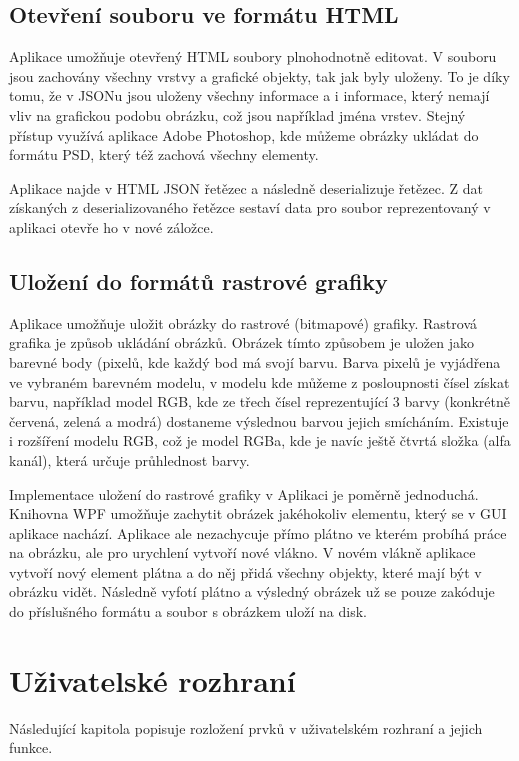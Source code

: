 \documentclass[
  field=inf,
  biblatex,
  glossaries,
  index
]{kidiplom}
\begin{document}
\subsection{Otevření souboru ve formátu HTML}
Aplikace umožňuje otevřený HTML soubory plnohodnotně editovat. V souboru jsou zachovány všechny vrstvy a grafické objekty, tak jak byly uloženy. To je díky tomu, že v JSONu jsou uloženy všechny informace a i informace, který nemají vliv na grafickou podobu obrázku, což jsou například jména vrstev. Stejný přístup využívá aplikace Adobe Photoshop, kde můžeme obrázky ukládat do formátu PSD, který též zachová všechny elementy.

Aplikace najde v HTML JSON řetězec a následně deserializuje řetězec. Z dat získaných z deserializovaného řetězce sestaví data pro soubor reprezentovaný v aplikaci otevře ho v nové záložce.

\subsection{Uložení do formátů rastrové grafiky}
Aplikace umožňuje uložit obrázky do rastrové (bitmapové) grafiky. Rastrová grafika je způsob ukládání obrázků. Obrázek tímto způsobem je uložen jako barevné body (pixelů, kde každý bod má svojí barvu. Barva pixelů je vyjádřena ve vybraném barevném modelu, v modelu kde můžeme z posloupnosti čísel získat barvu, například model RGB, kde ze třech čísel reprezentující 3 barvy (konkrétně červená, zelená a modrá) dostaneme výslednou barvou jejich smícháním. Existuje i rozšíření modelu RGB, což je model RGBa, kde je navíc ještě čtvrtá složka (alfa kanál), která určuje průhlednost barvy.

Implementace uložení do rastrové grafiky v Aplikaci je poměrně jednoduchá. Knihovna WPF umožňuje zachytit obrázek jakéhokoliv elementu, který se v GUI aplikace nachází. Aplikace ale nezachycuje přímo plátno ve kterém probíhá práce na obrázku, ale pro urychlení vytvoří nové vlákno. V novém vlákně aplikace vytvoří nový element plátna a do něj přidá všechny objekty, které mají být v obrázku vidět. Následně vyfotí plátno a výsledný obrázek už se pouze zakóduje do příslušného formátu a soubor s obrázkem uloží na disk.


\section{Uživatelské rozhraní}

Následující kapitola popisuje rozložení prvků v uživatelském rozhraní a jejich funkce.
\end{document}
